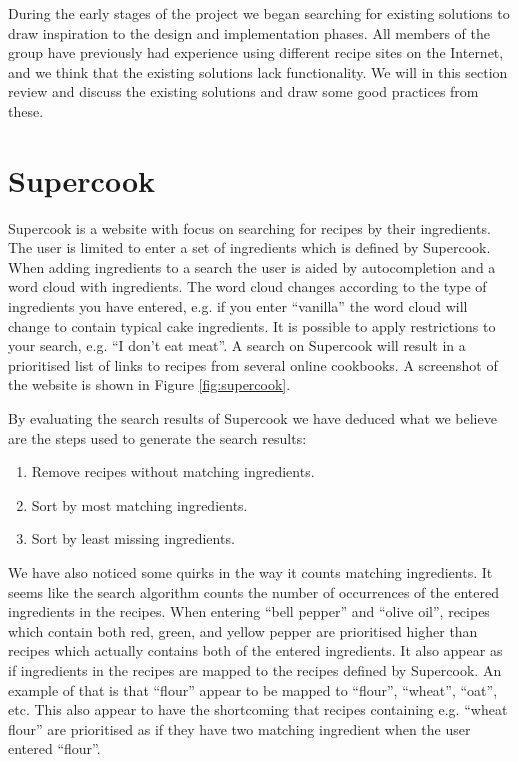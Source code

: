 During the early stages of the project we began searching for existing solutions to draw inspiration to the design and implementation phases. All members of the group have previously had experience using different recipe sites on the Internet, and we  think that the existing solutions lack functionality. We will in this section review and discuss the existing solutions and draw some good practices from these.

\section{Supercook}
Supercook\cite{supercook} is a website with focus on searching for recipes by their ingredients. The user is limited to enter a set of ingredients which is defined by Supercook. When adding ingredients to a search the user is aided by autocompletion and a word cloud with ingredients. The word cloud changes according to the type of ingredients you have entered, e.g. if you enter ``vanilla'' the word cloud will change to contain typical cake ingredients. It is possible to apply restrictions to your search, e.g. ``I don't eat meat''. A search on Supercook will result in a prioritised list of links to recipes from several online cookbooks. A screenshot of the website is shown in Figure \ref{fig:supercook}.

By evaluating the search results of Supercook we have deduced what we believe are the steps used to generate the search results:
\begin{enumerate}
	\item Remove recipes without matching ingredients.
	\item Sort by most matching ingredients.
	\item Sort by least missing ingredients.
\end{enumerate}
We have also noticed some quirks in the way it counts matching ingredients. It seems like the search algorithm counts the number of occurrences of the entered ingredients in the recipes. When entering ``bell pepper'' and ``olive oil'', recipes which contain both red, green, and yellow pepper are prioritised higher than recipes which actually contains both of the entered ingredients. It also appear as if ingredients in the recipes are mapped to the recipes defined by Supercook. An example of that is that ``flour'' appear to be mapped to ``flour'', ``wheat'', ``oat'', etc. This also appear to have the shortcoming that recipes containing e.g. ``wheat flour'' are prioritised as if they have two matching ingredient when the user entered ``flour''.

